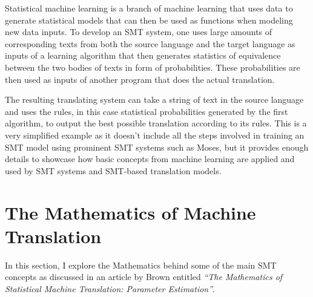 Statistical machine learning is a branch of machine learning that uses data to generate statistical models that can then be used as functions when modeling new data inputs. To develop an SMT system, one uses large amounts of corresponding texts from both the source language and the target language as inputs of a learning algorithm that then generates statistics of equivalence between the two bodies of texts in form of probabilities. These probabilities are then used as inputs of another program that does the actual translation. 

The resulting translating system can take a string of text in the source language and uses the rules, in this case statistical probabilities generated by the first algorithm, to output the best possible translation according to its rules. This is a very simplified example as it doesn't include all the steps involved in training an SMT model using prominent SMT systems such as Moses\cite{koehn2007moses}, but it provides enough details to showcase how basic concepts from machine learning are applied and used by SMT systems and SMT-based translation models. 
\section{The Mathematics of Machine Translation}
In this section, I explore the Mathematics behind some of the main SMT concepts as discussed in an article by Brown \etal entitled \textit{``The Mathematics of Statistical Machine Translation: Parameter Estimation''}\cite{brown1993mathematics}.
